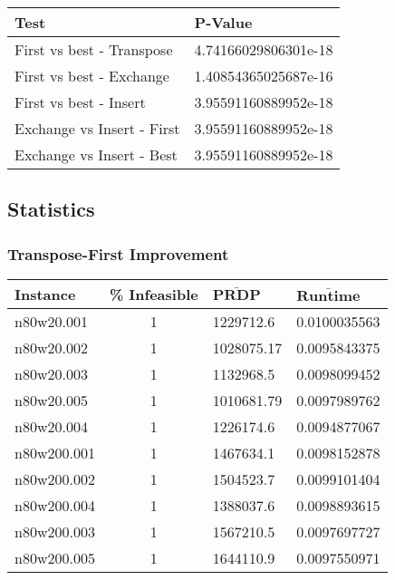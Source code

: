 \begin{homeworkProblem}
\begin{center}
\begin{tabular}{|l|l|}
\hline
\textbf{Test} & \textbf{P-Value} \\
\hline
First vs best - Transpose&4.74166029806301e-18\\
\hline
First vs best - Exchange&1.40854365025687e-16\\
\hline
First vs best - Insert&3.95591160889952e-18\\
\hline
Exchange vs Insert - First&3.95591160889952e-18\\
\hline
Exchange vs Insert - Best&3.95591160889952e-18\\
\hline
\end{tabular}
\label{tab:w.10}
\end{center}

\subsection{Statistics}

\subsubsection{Transpose-First Improvement}
\begin{center}
\begin{tabular}{|l|c|l|l|}
\hline
\textbf{Instance}& \textbf{\% Infeasible} & $\mathbf{\bar{PRDP}}$ &$\mathbf{\bar{Runtime}}$\\
\hline
n80w20.001&1&1229712.6&0.0100035563\\
\hline
n80w20.002&1&1028075.17&0.0095843375\\
\hline
n80w20.003&1&1132968.5&0.0098099452\\
\hline
n80w20.005&1&1010681.79&0.0097989762\\
\hline
n80w20.004&1&1226174.6&0.0094877067\\
\hline
n80w200.001&1&1467634.1&0.0098152878\\
\hline
n80w200.002&1&1504523.7&0.0099101404\\
\hline
n80w200.004&1&1388037.6&0.0098893615\\
\hline
n80w200.003&1&1567210.5&0.0097697727\\
\hline
n80w200.005&1&1644110.9&0.0097550971\\
\hline
\end{tabular}
\label{tab:t.f}
\end{center}


\end{homeworkProblem}
